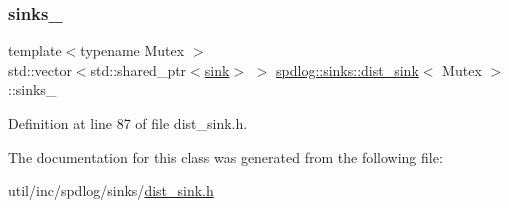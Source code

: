 \subsubsection{\texorpdfstring{sinks\+\_\+}{sinks\_}}
{\footnotesize\ttfamily template$<$typename Mutex $>$ \\
std\+::vector$<$std\+::shared\+\_\+ptr$<$\hyperlink{classspdlog_1_1sinks_1_1sink}{sink}$>$ $>$ \hyperlink{classspdlog_1_1sinks_1_1dist__sink}{spdlog\+::sinks\+::dist\+\_\+sink}$<$ Mutex $>$\+::sinks\+\_\+\hspace{0.3cm}{\ttfamily [protected]}}



Definition at line 87 of file dist\+\_\+sink.\+h.



The documentation for this class was generated from the following file\+:\begin{DoxyCompactItemize}
\item 
util/inc/spdlog/sinks/\hyperlink{dist__sink_8h}{dist\+\_\+sink.\+h}\end{DoxyCompactItemize}
